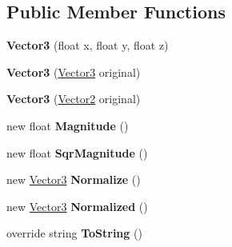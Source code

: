 \subsection*{Public Member Functions}
\begin{DoxyCompactItemize}
\item 
\mbox{\label{class_pillar3_d_1_1_vector3_a44cbb02c26ce15969a2d75a16607618d}} 
{\bfseries Vector3} (float x, float y, float z)
\item 
\mbox{\label{class_pillar3_d_1_1_vector3_adfa9028294445953a719ada637eea96f}} 
{\bfseries Vector3} (\hyperlink{class_pillar3_d_1_1_vector3}{Vector3} original)
\item 
\mbox{\label{class_pillar3_d_1_1_vector3_aab563750d002b183a1eb6327f9807f91}} 
{\bfseries Vector3} (\hyperlink{class_pillar3_d_1_1_vector2}{Vector2} original)
\item 
\mbox{\label{class_pillar3_d_1_1_vector3_aefae9512d036dd1a7765fa3fb1d56581}} 
new float {\bfseries Magnitude} ()
\item 
\mbox{\label{class_pillar3_d_1_1_vector3_a0cb349a385d9e4cc42df2056f64824e5}} 
new float {\bfseries Sqr\+Magnitude} ()
\item 
\mbox{\label{class_pillar3_d_1_1_vector3_adfbc811e52af952f655a7794e8f06325}} 
new \hyperlink{class_pillar3_d_1_1_vector3}{Vector3} {\bfseries Normalize} ()
\item 
\mbox{\label{class_pillar3_d_1_1_vector3_ae85877f86f52a771377ad5b0635b762f}} 
new \hyperlink{class_pillar3_d_1_1_vector3}{Vector3} {\bfseries Normalized} ()
\item 
\mbox{\label{class_pillar3_d_1_1_vector3_a99b6ac01b7b55fb6e50148f3a7fde0b7}} 
override string {\bfseries To\+String} ()
\end{DoxyCompactItemize}
